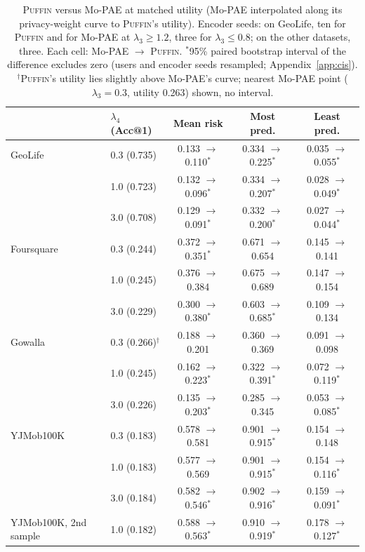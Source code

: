 \documentclass[sigconf,anonymous,review]{acmart}
\newcommand{\puffin}{\textsc{Puffin}}
\begin{document}
\begin{table}[t]
\centering
\caption{\puffin{} versus Mo-PAE at matched utility (Mo-PAE interpolated along its privacy-weight curve to \puffin's utility). Encoder seeds: on GeoLife, ten for \puffin{} and for Mo-PAE at $\lambda_3\ge1.2$, three for $\lambda_3\le0.8$; on the other datasets, three. Each cell: Mo-PAE $\to$ \puffin. $^*$95\% paired bootstrap interval of the difference excludes zero (users and encoder seeds resampled; Appendix~\ref{app:cis}). $^\dagger$\puffin's utility lies slightly above Mo-PAE's curve; nearest Mo-PAE point ($\lambda_3=0.3$, utility 0.263) shown, no interval.}
\label{tab:matched}
\small
\begin{tabular}{@{}llccc@{}}
\toprule
 & $\lambda_4$ (Acc@1) & Mean risk & Most pred. & Least pred. \\
\midrule
GeoLife & 0.3 (0.735) & 0.133 $\to$ 0.110$^*$ & 0.334 $\to$ 0.225$^*$ & 0.035 $\to$ 0.055$^*$ \\
 & 1.0 (0.723) & 0.132 $\to$ 0.096$^*$ & 0.334 $\to$ 0.207$^*$ & 0.028 $\to$ 0.049$^*$ \\
 & 3.0 (0.708) & 0.129 $\to$ 0.091$^*$ & 0.332 $\to$ 0.200$^*$ & 0.027 $\to$ 0.044$^*$ \\
\addlinespace
Foursquare & 0.3 (0.244) & 0.372 $\to$ 0.351$^*$ & 0.671 $\to$ 0.654 & 0.145 $\to$ 0.141 \\
 & 1.0 (0.245) & 0.376 $\to$ 0.384 & 0.675 $\to$ 0.689 & 0.147 $\to$ 0.154 \\
 & 3.0 (0.229) & 0.300 $\to$ 0.380$^*$ & 0.603 $\to$ 0.685$^*$ & 0.109 $\to$ 0.134 \\
\addlinespace
Gowalla & 0.3 (0.266)$^\dagger$ & 0.188 $\to$ 0.201 & 0.360 $\to$ 0.369 & 0.091 $\to$ 0.098 \\
 & 1.0 (0.245) & 0.162 $\to$ 0.223$^*$ & 0.322 $\to$ 0.391$^*$ & 0.072 $\to$ 0.119$^*$ \\
 & 3.0 (0.226) & 0.135 $\to$ 0.203$^*$ & 0.285 $\to$ 0.345 & 0.053 $\to$ 0.085$^*$ \\
\addlinespace
YJMob100K & 0.3 (0.183) & 0.578 $\to$ 0.581 & 0.901 $\to$ 0.915$^*$ & 0.154 $\to$ 0.148 \\
 & 1.0 (0.183) & 0.577 $\to$ 0.569 & 0.901 $\to$ 0.915$^*$ & 0.154 $\to$ 0.116$^*$ \\
 & 3.0 (0.184) & 0.582 $\to$ 0.546$^*$ & 0.902 $\to$ 0.916$^*$ & 0.159 $\to$ 0.091$^*$ \\
YJMob100K, 2nd sample & 1.0 (0.182) & 0.588 $\to$ 0.563$^*$ & 0.910 $\to$ 0.919$^*$ & 0.178 $\to$ 0.127$^*$ \\
\bottomrule
\end{tabular}
\end{table}
\end{document}
